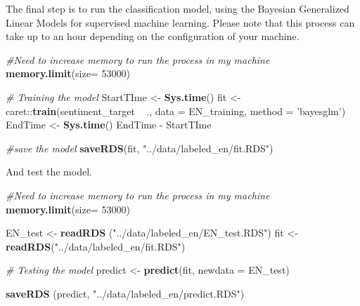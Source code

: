 \documentclass[]{article}
\newenvironment{Shaded}{\begin{snugshade}}{\end{snugshade}}
\newcommand{\KeywordTok}[1]{\textcolor[rgb]{0.13,0.29,0.53}{\textbf{{#1}}}}
\newcommand{\DataTypeTok}[1]{\textcolor[rgb]{0.13,0.29,0.53}{{#1}}}
\newcommand{\DecValTok}[1]{\textcolor[rgb]{0.00,0.00,0.81}{{#1}}}
\newcommand{\StringTok}[1]{\textcolor[rgb]{0.31,0.60,0.02}{{#1}}}
\newcommand{\CommentTok}[1]{\textcolor[rgb]{0.56,0.35,0.01}{\textit{{#1}}}}
\newcommand{\NormalTok}[1]{{#1}}
\begin{document}
The final step is to run the classification model, using the Bayesian
Generalized Linear Models for supervised machine learning. Please note
that this process can take up to an hour depending on the configuration
of your machine.

\begin{Shaded}
\begin{Highlighting}[]
\CommentTok{#Need to increase memory to run the process in my machine}
\KeywordTok{memory.limit}\NormalTok{(}\DataTypeTok{size=} \DecValTok{53000}\NormalTok{)    }

\CommentTok{# Training the model}
\NormalTok{StartTIme <-}\StringTok{ }\KeywordTok{Sys.time}\NormalTok{()}
\NormalTok{fit <-}\StringTok{ }\NormalTok{caret::}\KeywordTok{train}\NormalTok{(sentiment_target ~}\StringTok{ }\NormalTok{., }\DataTypeTok{data =} \NormalTok{EN_training, }\DataTypeTok{method =} \StringTok{'bayesglm'}\NormalTok{)}
\NormalTok{EndTime <-}\StringTok{ }\KeywordTok{Sys.time}\NormalTok{()}
\NormalTok{EndTime -}\StringTok{ }\NormalTok{StartTIme}

\CommentTok{#save the model}
\KeywordTok{saveRDS}\NormalTok{(fit, }\StringTok{"../data/labeled_en/fit.RDS"}\NormalTok{)}
\end{Highlighting}
\end{Shaded}

And test the model.

\begin{Shaded}
\begin{Highlighting}[]
\CommentTok{#Need to increase memory to run the process in my machine}
\KeywordTok{memory.limit}\NormalTok{(}\DataTypeTok{size=} \DecValTok{53000}\NormalTok{)    }

\NormalTok{EN_test <-}\StringTok{ }\KeywordTok{readRDS} \NormalTok{(}\StringTok{"../data/labeled_en/EN_test.RDS"}\NormalTok{)}
\NormalTok{fit <-}\StringTok{ }\KeywordTok{readRDS}\NormalTok{(}\StringTok{"../data/labeled_en/fit.RDS"}\NormalTok{)}


\CommentTok{# Testing the model}
\NormalTok{predict <-}\StringTok{ }\KeywordTok{predict}\NormalTok{(fit, }\DataTypeTok{newdata =} \NormalTok{EN_test)}


\KeywordTok{saveRDS} \NormalTok{(predict, }\StringTok{"../data/labeled_en/predict.RDS"}\NormalTok{)}
\end{Highlighting}
\end{Shaded}

\begin{Shaded}
\end{Shaded}
\end{document}

